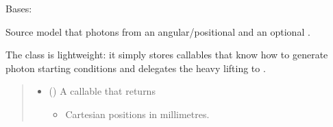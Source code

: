 \documentclass[letterpaper,10pt,english]{sphinxmanual}
\begin{document}

\begin{fulllineitems}
\label{\detokenize{generated/photon_canon.optics:photon_canon.optics.Illumination}}
\pysigstartsignatures
\pysiglinewithargsret
{}
{\sphinxparamcomma {}\sphinxparamcomma {}\sphinxparamcomma {}\sphinxparamcomma {}\sphinxparamcomma {}\sphinxparamcomma {}}
{}
\pysigstopsignatures
\sphinxAtStartPar
Bases: 

\sphinxAtStartPar
Source model that  photons from an angular/positional
 and an optional .

\sphinxAtStartPar
The class is lightweight: it simply stores callables that know
how to generate photon starting conditions and delegates the heavy
lifting to {\hyperref[\detokenize{generated/photon_canon.optics:photon_canon.optics.Photon}]{}}.
\begin{quote}\begin{description}
\begin{itemize}
\item {} 
\sphinxAtStartPar
{} (\sphinxstyleliteralemphasis{\sphinxupquote{{[}}}\sphinxstyleliteralemphasis{\sphinxupquote{{[}}}\sphinxstyleliteralemphasis{\sphinxupquote{{]}}}\sphinxstyleliteralemphasis{\sphinxupquote{, }}\sphinxstyleliteralemphasis{\sphinxupquote{{[}}}\sphinxstyleliteralemphasis{\sphinxupquote{, }}\sphinxstyleliteralemphasis{\sphinxupquote{{]}}}\sphinxstyleliteralemphasis{\sphinxupquote{{]}}}) \textendash{} 
\sphinxAtStartPar
A callable  that
returns
\begin{itemize}
\item {} 
\sphinxAtStartPar
{} \textendash{} Cartesian positions  in millimetres.


\end{itemize}
\end{itemize}
\end{description}
\end{quote}
\end{fulllineitems}
\end{document}
